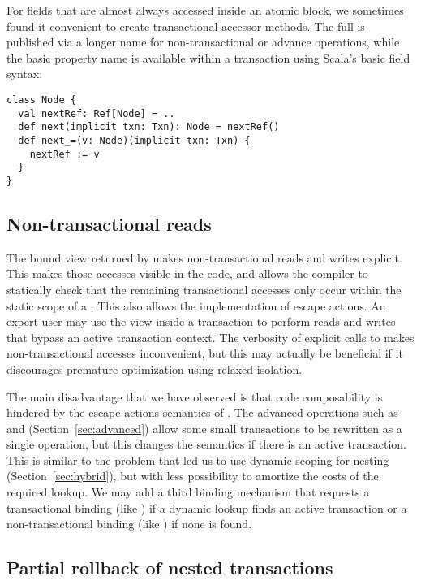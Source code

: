 For fields that are almost always accessed inside an atomic block, we
sometimes found it convenient to create transactional accessor methods.
The full  is published via a longer name for non-transactional
or advance operations, while the basic property name is available within
a transaction using Scala's basic field syntax:
\lstset{numbers=none}
\lstset{xleftmargin=0.125in}
\begin{lstlisting}
class Node {
  val nextRef: Ref[Node] = ..
  def next(implicit txn: Txn): Node = nextRef()
  def next_=(v: Node)(implicit txn: Txn) {
    nextRef := v 
  }
}
\end{lstlisting}
\lstset{xleftmargin=0.25in}
\lstset{numbers=left}

\subsection{Non-transactional reads}

The bound view returned by  makes
non-transactional reads and writes explicit.  This makes those accesses
visible in the code, and allows the compiler to statically check that
the remaining transactional accesses only occur within the static scope
of a .  This also allows the implementation of escape actions.
An expert user may use the  view inside a transaction to
perform reads and writes that bypass an active transaction context.
The verbosity of explicit calls to  makes non-transactional
accesses inconvenient, but this may actually be beneficial if it discourages
premature optimization using relaxed isolation.

The main disadvantage that we have observed is that code composability is
hindered by the escape actions semantics of .  The advanced
 operations such as  and 
(Section~\ref{sec:advanced}) allow some small transactions to be rewritten
as a single operation, but this changes the semantics if there is an
active transaction.  This is similar to the problem that led us to use
dynamic scoping for nesting (Section~\ref{sec:hybrid}), but with less
possibility to amortize the costs of the required 
lookup.
We may add a third binding mechanism that requests a transactional
binding (like ) if a dynamic lookup finds an active
transaction or a non-transactional binding (like )
if none is found.

\subsection{Partial rollback of nested transactions}


